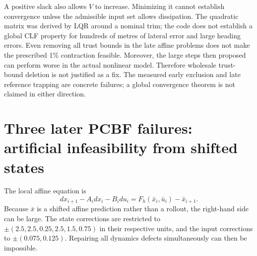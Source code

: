 \documentclass[11pt]{article}
\begin{document}
A positive slack also allows $V$ to increase. Minimizing it cannot establish
convergence unless the admissible input set allows dissipation. The quadratic
matrix was derived by LQR around a nominal trim; the code does not establish
a global CLF property for hundreds of metres of lateral error and large
heading errors. Even removing all trust bounds in the late affine problems
does not make the prescribed 1\% contraction feasible. Moreover, the large
steps then proposed can perform worse in the actual nonlinear model.
Therefore wholesale trust-bound deletion is not justified as a fix. The
measured early exclusion and late reference trapping are concrete failures;
a global convergence theorem is not claimed in either direction.

\section{Three later PCBF failures: artificial infeasibility from shifted states}
The local affine equation is
\[
 d x_{i+1}-A_i d x_i-B_i d u_i
 =F_h(\bar x_i,\bar u_i)-\bar x_{i+1}.
\]
Because $\bar x$ is a shifted affine prediction rather than a rollout,
the right-hand side can be large. The state corrections are restricted to
$\pm(2.5,2.5,0.25,2.5,1.5,0.75)$ in their respective units, and the input
corrections to $\pm(0.075,0.125)$. Repairing all dynamics defects simultaneously
can then be impossible.
\end{document}

